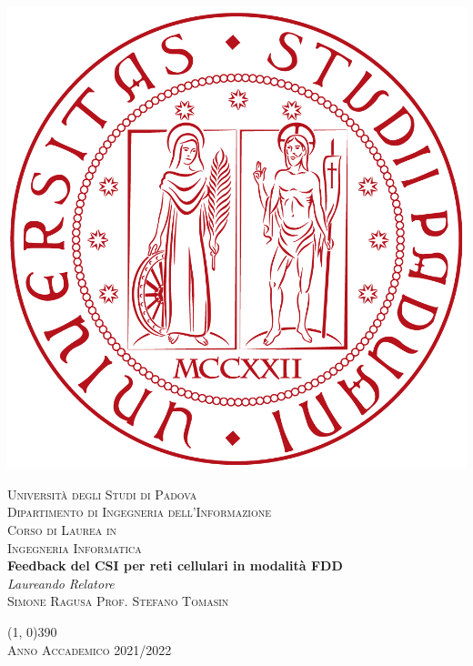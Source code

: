 



\frontmatter

\begin{titlepage}
    \begin{center}
        \includegraphics[scale=0.1]{images/unipd-red.png}

        \vspace{0.8cm}
        \textsc{\LARGE Università degli Studi di Padova}\\
        \vspace{0.45cm}
        \textsc{\large Dipartimento di Ingegneria dell'Informazione}\\
        \vspace{0.4cm}
        \textsc{\large Corso di Laurea in}\\
        \textsc{\large Ingegneria Informatica}\\

        \vfill
        {\LARGE \bfseries Feedback del CSI per reti cellulari in modalità FDD}\\

        \vfill
        \textit{\large Laureando}
        \hfill
        \textit{\large Relatore}\\
        \textsc{\large Simone Ragusa}
        \hfill
        \textsc{\large Prof. Stefano Tomasin}\\

        \vspace{0.4cm}

        \vfill
        \line(1, 0){390}\\
        \textsc{Anno Accademico 2021/2022}
    \end{center}
\end{titlepage}

